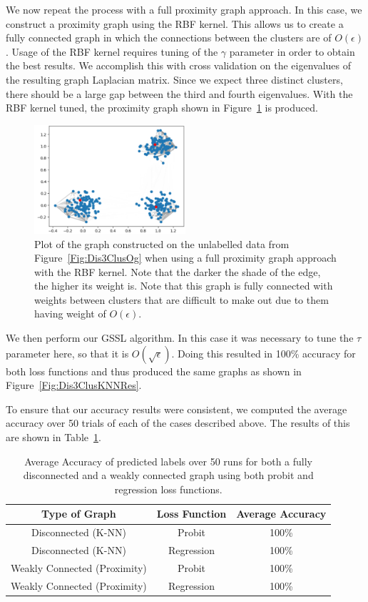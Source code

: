 \documentclass[12pt]{amsart}
\begin{document}
We now repeat the process with a full proximity graph approach. In this case, we construct a proximity graph using the RBF kernel. This allows us to create a fully connected graph in which the connections between the clusters are of $O(\epsilon)$. Usage of the RBF kernel requires tuning of the $\gamma$ parameter in order to obtain the best results. We accomplish this with cross validation on the eigenvalues of the resulting graph Laplacian matrix. Since we expect three distinct clusters, there should be a large gap between the third and fourth eigenvalues. With the RBF kernel tuned, the proximity graph shown in Figure~\ref{Fig:Dis3ClusProx} is produced.
\begin{figure}
    \centering
    \includegraphics[width=0.5\textwidth]{Figures/Dis3ClusProx.png}
    \caption{
        Plot of the graph constructed on the unlabelled data from Figure~\ref{Fig:Dis3ClusOg} when using a full proximity graph approach with the RBF kernel. Note that the darker the shade of the edge, the higher its weight is. Note that this graph is fully connected with weights between clusters that are difficult to make out due to them having weight of $O(\epsilon)$.
    }
	\label{Fig:Dis3ClusProx}
\end{figure}

We then perform our GSSL algorithm. In this case it was necessary to tune the $\tau$ parameter here, so that it is $O(\sqrt{\epsilon})$. Doing this resulted in 100\% accuracy for both loss functions and thus produced the same graphs as shown in Figure~\ref{Fig:Dis3ClusKNNRes}.

To ensure that our accuracy results were consistent, we computed the average accuracy over 50 trials of each of the cases described above. The results of this are shown in Table~\ref{Table:3ClusRes}.
\begin{table}
\begin{center}
\begin{tabular}{||c c c||} 
 \hline
 Type of Graph & Loss Function & Average Accuracy\\  
 \hline\hline
 Disconnected (K-NN) & Probit & 100\% \\ 
 \hline
 Disconnected (K-NN) & Regression & 100\% \\
 \hline
 Weakly Connected (Proximity) & Probit & 100\% \\
 \hline
 Weakly Connected (Proximity) & Regression & 100\% \\ 
 \hline
\end{tabular}
\caption{Average Accuracy of predicted labels over 50 runs for both a fully disconnected and a weakly connected graph using both probit and regression loss functions.}
\label{Table:3ClusRes}
\end{center}
\end{table}
\end{document}
